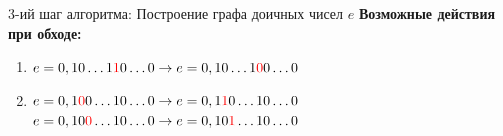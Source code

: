 \documentclass[russian, unicode, mathserif, aspectratio=169]{beamer}
\begin{document}
\begin{frame}{3-ий шаг алгоритма: Построение графа доичных чисел $e$}
    \textbf{Возможные действия при обходе:}
    \begin{enumerate}
        \item $e = 0,10\ldots1{\color{red}1}0\ldots0 \rightarrow e = 0,10\ldots1{\color{red}0}0\ldots0$
        \begin{figure}[h!]
        \end{figure}
        \item $e = 0,1{\color{red}0}0\ldots10\ldots0 \rightarrow e = 0,1{\color{red}1}0\ldots10\ldots0$\\
        $e = 0,10{\color{red}0}\ldots10\ldots0 \rightarrow e = 0,10{\color{red}1}\ldots10\ldots0$
        \begin{figure}[h!]
        \end{figure} 
    \end{enumerate}
\end{frame}
\end{document}
